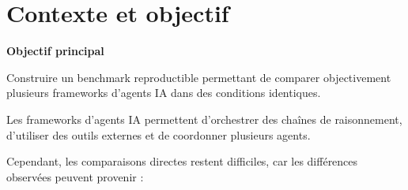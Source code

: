 \documentclass[12pt,a4paper]{article}
\begin{document}

\begin{abstract}
\vspace{1cm}
\noindent AgentBench-FR propose une méthodologie reproductible permettant
de comparer plusieurs frameworks d'agents IA dans un environnement
strictement contrôlé.

Le benchmark évalue LangChain, CrewAI, AutoGen et LlamaIndex
à travers une campagne de 120 tâches couvrant plusieurs catégories :
recherche d'information, raisonnement séquentiel,
récupération documentaire,
collaboration multi-agent
et robustesse face aux ambiguïtés.

L'étude harmonise le backend d'exécution,
les paramètres de génération,
la structure des entrées-sorties
et les ressources matérielles
afin d'isoler l'impact réel du framework.

Les métriques observées incluent
la complétion,
la latence,
la consommation de ressources,
l'utilisation de tokens
et la stabilité d'exécution.
\vspace{1cm}
\end{abstract}

\newpage
{\hypersetup{linkcolor=black} %
\tableofcontents
}
\newpage


\section{Contexte et objectif}

\begin{keypoint}

\textbf{Objectif principal}

Construire un benchmark reproductible permettant
de comparer objectivement plusieurs frameworks
d'agents IA dans des conditions identiques.

\end{keypoint}

Les frameworks d'agents IA permettent
d'orchestrer des chaînes de raisonnement,
d'utiliser des outils externes
et de coordonner plusieurs agents.

Cependant,
les comparaisons directes restent difficiles,
car les différences observées peuvent provenir :
\end{document}
